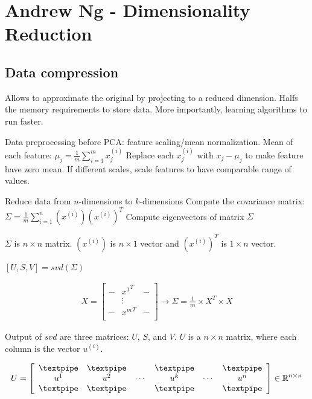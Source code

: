 \hypertarget{andrew-ng---dimensionality-reduction}{%
\section{Andrew Ng - Dimensionality
Reduction}\label{andrew-ng---dimensionality-reduction}}

\hypertarget{data-compression}{%
\subsection{Data compression}\label{data-compression}}

Allows to approximate the original by projecting to a reduced dimension.
Halfs the memory requirements to store data. More importantly, learning
algorithms to run faster.

Data preprocessing before PCA: feature scaling/mean normalization. Mean
of each feature:
\(\mu_j = \frac{1}{m} \displaystyle\sum^{m}_{i=1}x_j^{(i)}\) Replace
each \(x_j^{(i)}\) with \(x_j - \mu_j\) to make feature have zero mean.
If different scales, scale features to have comparable range of values.

Reduce data from \(n\)-dimensions to \(k\)-dimensions Compute the
covariance matrix:
\(\Sigma = \frac{1}{m}\displaystyle\sum_{i=1}^n(x^{(i)})(x^{(i)})^T\)
Compute eigenvectors of matrix \(\Sigma\)

\(\Sigma\) is \(n \times n\) matrix. \((x^{(i)})\) is \(n \times 1\)
vector and \((x^{(i)})^T\) is \(1 \times n\) vector.

\([U,S,V] = svd(\Sigma)\)

\begin{align*}
X =
\left[
\begin{array}{ccc}
- & {x^1}^T & -\\
  & \vdots &   \\
- & {x^m}^T & - \\
\end{array}
\right]
\rightarrow \Sigma = \frac{1}{m} \times X^T \times X
\end{align*}

Output of \(svd\) are three matrices: \(U\), \(S\), and \(V\). \(U\) is
a \(n \times n\) matrix, where each column is the vector \(u^{(i)}\).

\begin{align*}
U = \left[
\begin{array}{cccccc}
\textpipe & \textpipe &        & \textpipe &        & \textpipe\\
u^1       &       u^2 & \cdots & u^k       & \cdots & u^n\\
\textpipe & \textpipe &        & \textpipe &        & \textpipe
\end{array}
\right]
\in \mathbb{R}^{n \times n}
\end{align*}

